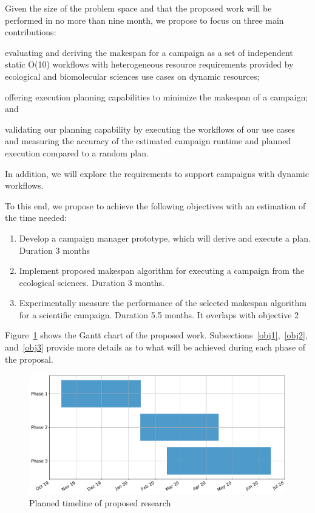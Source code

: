 \label{timeline}
Given the size of the problem space and that the proposed work will be performed in no more than nine month, we propose to focus on three main contributions:
\begin{inparaenum}[(1)]
\item evaluating and deriving the makespan for a campaign as a set of independent static O(10) workflows with heterogeneous resource requirements provided by ecological and biomolecular sciences use cases on dynamic resources; 
\item offering execution planning capabilities to minimize the makespan of a campaign; and 
\item validating our planning capability by executing the workflows of our use cases and measuring the accuracy of the estimated campaign runtime and planned execution compared to a random plan.
\end{inparaenum}
In addition, we will explore the requirements to support campaigns with dynamic workflows.

To this end, we propose to achieve the following objectives with an estimation of the time needed:
\begin{enumerate}
    \item Develop a campaign manager prototype, which will derive and execute a plan. Duration 3 months
    \item Implement proposed makespan algorithm for executing a campaign from the ecological sciences. Duration 3 months.
    \item Experimentally measure the performance of the selected makespan algorithm for a scientific campaign. Duration 5.5 months. It overlaps with objective 2 
\end{enumerate}
Figure~\ref{fig:work_plan} shows the Gantt chart of the proposed work.
Subsections~\ref{obj1},~\ref{obj2}, and~\ref{obj3} provide more details as to what will be achieved during each phase of the proposal.

\begin{figure}[t]
	\centering
	\includegraphics[width=.95\textwidth]{figures/phd_plan.pdf}
	\caption{Planned timeline of proposed research}\label{fig:work_plan}
\end{figure}

